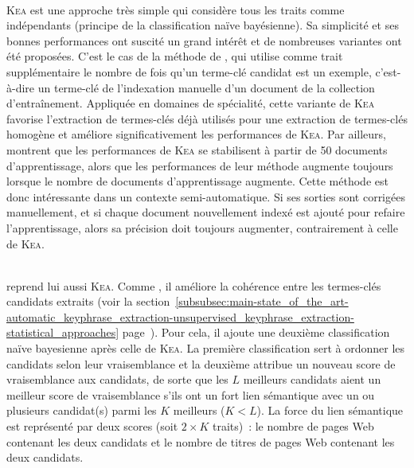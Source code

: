         ~\\\textsc{Kea} est une approche très simple qui considère tous les
        traits comme indépendants (principe de la classification naïve
        bayésienne). Sa simplicité et ses bonnes performances ont suscité un
        grand intérêt et de nombreuses variantes ont été proposées. C'est le cas
        de la méthode de , qui utilise comme
        trait supplémentaire le nombre de fois qu'un terme-clé candidat est un
        exemple, c'est-à-dire un terme-clé de l'indexation manuelle d'un
        document de la collection d'entraînement. Appliquée
        en domaines de spécialité, cette variante de \textsc{Kea} favorise
        l'extraction de termes-clés déjà utilisés pour une extraction de
        termes-clés homogène et améliore significativement les performances de
        \textsc{Kea}. Par ailleurs,  montrent que
        les performances de \textsc{Kea} se stabilisent à partir de 50 documents
        d'apprentissage, alors que les performances de leur méthode augmente
        toujours lorsque le nombre de documents d'apprentissage augmente. Cette
        méthode est donc intéressante dans un contexte semi-automatique. Si ses
        sorties sont corrigées manuellement,
        et si chaque document nouvellement indexé est ajouté pour refaire
        l'apprentissage, alors sa précision doit toujours augmenter, contrairement à
        celle de \textsc{Kea}.
        
        ~\\ reprend lui aussi \textsc{Kea}.
        Comme , il améliore la
        cohérence entre les termes-clés candidats extraits (voir la
        section~\ref{subsubsec:main-state_of_the_art-automatic_keyphrase_extraction-unsupervised_keyphrase_extraction-statistical_approaches}
        page~\pageref{subsubsec:main-state_of_the_art-automatic_keyphrase_extraction-unsupervised_keyphrase_extraction-statistical_approaches:ilp}).
        Pour cela,
        il ajoute une deuxième classification naïve bayesienne après celle de
        \textsc{Kea}. La première classification sert à ordonner les candidats
        selon leur vraisemblance et la deuxième attribue un nouveau score de
        vraisemblance aux candidats, de sorte que les $L$ meilleurs candidats
        aient un meilleur score de vraisemblance s'ils ont un fort lien
        sémantique avec un ou plusieurs candidat(s) parmi les $K$ meilleurs ($K
        < L$). La force du lien sémantique est représenté par deux scores (soit
        $2 \times K$ traits)~: le nombre de pages Web contenant les deux
        candidats et le nombre de titres de pages Web contenant les deux
        candidats.

